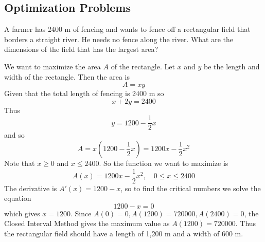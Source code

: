 \subsection{Optimization Problems}

\begin{problem}
    A farmer has 2400 m of fencing and wants to fence off a rectangular field
    that borders a straight river.
    He needs no fence along the river.
    What are the dimensions of the field that has the largest area?
\end{problem}
\begin{solution}
    We want to maximize the area \(A\) of the rectangle.
    Let \(x\) and \(y\) be the length and width of the rectangle.
    Then the area is
    \[A=xy\]
    Given that the total length of fencing is 2400 m so
    \[x+2y=2400\]
    Thus
    \[y=1200-\frac{1}{2}x\]
    and so
    \[A=x\left(1200-\frac{1}{2}x\right)=1200x-\frac{1}{2}x^2\]
    Note that \(x\geq 0\) and \(x\leq 2400\).
    So the function we want to maximize is
    \[A(x)=1200x-\frac{1}{2}x^2,\quad 0\leq x\leq 2400\]
    The derivative is \(A'(x)=1200-x\), so to find the critical numbers we solve
    the equation
    \[1200-x=0\]
    which gives \(x=1200\).
    Since \(A(0)=0,A(1200)=720000,A(2400)=0\), the Closed Interval Method
    gives the maximum value as \(A(1200)=720000\).
    Thus the rectangular field should have a length of 1,200 m and a width of
    600 m.
\end{solution}